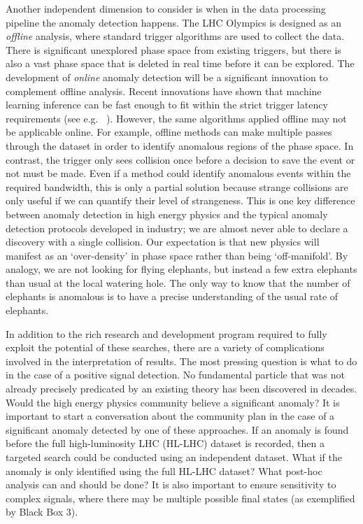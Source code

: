 \documentclass[a4paper,11pt]{article}
\begin{document}
Another independent dimension to consider is when in the data processing pipeline the anomaly detection happens.  The LHC Olympics is designed as an \textit{offline} analysis, where standard trigger algorithms are used to collect the data.  There is significant unexplored phase space from existing triggers, but there is also a vast phase space that is deleted in real time before it can be explored.  The development of \textit{online} anomaly detection will be a significant innovation to complement offline analysis.  Recent innovations have shown that machine learning inference can be fast enough to fit within the strict trigger latency requirements (see e.g. ~\cite{Duarte:2018ite,CERN-LHCC-2020-004}).  However, the same algorithms applied offline may not be applicable online.  For example, offline methods can make multiple passes through the dataset in order to identify anomalous regions of the phase space.  In contrast, the trigger only sees collision once before a decision to save the event or not must be made.  Even if a method could identify anomalous events within the required bandwidth, this is only a partial solution because strange collisions are only useful if we can quantify their level of strangeness.  This is one key difference between anomaly detection in high energy physics and the typical anomaly detection protocols developed in industry; we are almost never able to declare a discovery with a single collision.  Our expectation is that new physics will manifest as an `over-density' in phase space rather than being `off-manifold'. By analogy, we are not looking for flying elephants, but instead a few extra elephants than usual at the local watering hole.  The only way to know that the number of elephants is anomalous is to have a precise understanding of the usual rate of elephants.

In addition to the rich research and development program required to fully exploit the potential of these searches, there are a variety of complications involved in the interpretation of results.  The most pressing question is what to do in the case of a positive signal detection.  No fundamental particle that was not already precisely predicated by an existing theory has been discovered in decades.  Would the high energy physics community believe a significant anomaly?  It is important to start a conversation about the community plan in the case of a significant anomaly detected by one of these approaches.  If an anomaly is found before the full high-luminosity LHC (HL-LHC) dataset is recorded, then a targeted search could be conducted using an independent dataset.  What if the anomaly is only identified using the full HL-LHC dataset?  What post-hoc analysis can and should be done?  It is also important to ensure sensitivity to complex signals, where there may be multiple possible final states (as exemplified by Black Box 3).
\end{document}
